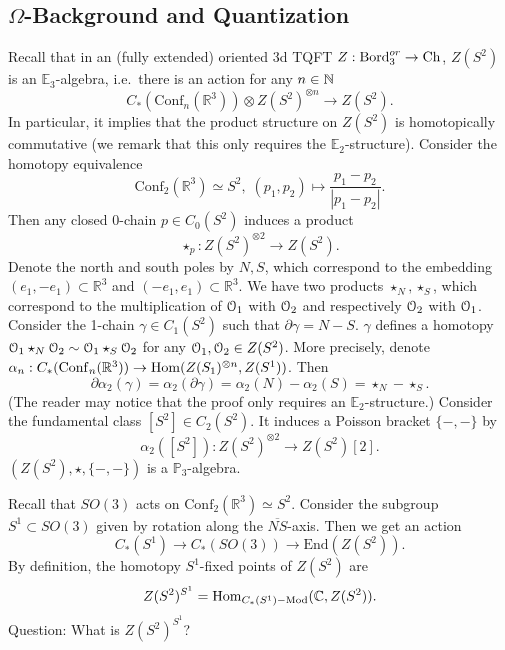
\subsection{$\Omega$-Background and Quantization}

Recall that in an (fully extended) oriented 3d TQFT $Z: \mathrm{Bord}^{or}_{3} \rightarrow \mathrm{Ch}$, $Z(S^2)$ is an $\mathbb{E}_3$-algebra, i.e.~there is an action for any $n \in \mathbb{N}$
$$C_*(\mathrm{Conf}_n(\mathbb{R}^3)) \otimes Z(S^2)^{\otimes n} \rightarrow Z(S^2).$$
In particular, it implies that the product structure on $Z(S^2)$ is homotopically commutative (we remark that this only requires the $\mathbb{E}_2$-structure). Consider the homotopy equivalence
$$\mathrm{Conf}_2(\mathbb{R}^3) \simeq S^2, \; (p_1, p_2) \mapsto \frac{p_1 - p_2}{|p_1 - p_2|}.$$
Then any closed 0-chain $p \in C_0(S^2)$ induces a product
$$\star_p: Z(S^2)^{\otimes 2} \rightarrow Z(S^2).$$
Denote the north and south poles by $N, S$, which correspond to the embedding $(e_1, -e_1) \subset \mathbb{R}^3$ and $(-e_1, e_1) \subset \mathbb{R}^3$. We have two products $\star_N, \star_S$, which correspond to the multiplication of $\mathcal{O}_1$ with $\mathcal{O}_2$ and respectively $\mathcal{O}_2$ with $\mathcal{O}_1$. Consider the 1-chain $\gamma \in C_1(S^2)$ such that $\partial \gamma = N - S$. $\gamma$ defines a homotopy $\mathcal{O}_1 \star_N \mathcal{O}_2 \sim \mathcal{O}_1 \star_S \mathcal{O}_2$ for any $\mathcal{O}_1, \mathcal{O}_2 \in Z(S^2)$. More precisely, denote $\alpha_n: C_*(\mathrm{Conf}_n(\mathbb{R}^3)) \rightarrow \mathrm{Hom}(Z(S_1)^{\otimes n}, Z(S^1))$. Then
$$\partial \alpha_2(\gamma) = \alpha_2(\partial \gamma) = \alpha_2(N) - \alpha_2(S) = \star_N - \star_S.$$
(The reader may notice that the proof only requires an $\mathbb{E}_2$-structure.) Consider the fundamental class $[S^2] \in C_2(S^2)$. It induces a Poisson bracket $\{-, -\}$ by
$$\alpha_2([S^2]): Z(S^2)^{\otimes 2} \rightarrow Z(S^2)[2].$$
$(Z(S^2), \star, \{-, -\})$ is a $\mathbb{P}_3$-algebra.

Recall that $SO(3)$ acts on $\mathrm{Conf}_2(\mathbb{R}^3) \simeq S^2$. Consider the subgroup $S^1 \subset SO(3)$ given by rotation along the $\overline{NS}$-axis. Then we get an action
$$C_*(S^1) \rightarrow C_*(SO(3)) \rightarrow \mathrm{End}(Z(S^2)).$$
By definition, the homotopy $S^1$-fixed points of $Z(S^2)$ are
$$Z(S^2)^{S^1} = \mathrm{Hom}_{C_*(S^1)-\mathrm{Mod}}(\mathbb{C}, Z(S^2)).$$
Question: What is $Z(S^2)^{S^1}$?

